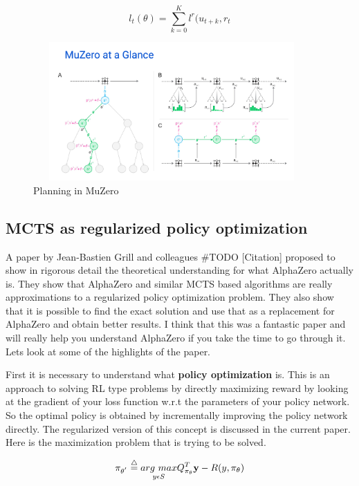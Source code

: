\begin{equation}
    l_{t}(\theta) = \sum_{k=0}^{K} l^{r}(u_{t + k},r_{t}
\end{equation}


\begin{figure}[H]
       \centering
       \includegraphics[width=400px,height=200px]{images/muzero_planning.png}
       \caption{Planning in MuZero}
       \label{fig:my_label}
\end{figure}


\subsection{MCTS as regularized policy optimization}

A paper by Jean-Bastien Grill and colleagues #TODO [Citation] proposed to show in rigorous detail the theoretical understanding for what AlphaZero actually is. They show that AlphaZero and similar MCTS based algorithms are really approximations to a regularized policy optimization problem. They also show that it is possible to find the exact solution and use that as a replacement for AlphaZero and obtain better results. I think that this was a fantastic paper and will really help you understand AlphaZero if you take the time to go through it. Lets look at some of the highlights of the paper. 

First it is necessary to understand what \textbf{policy optimization} is. This is an approach to solving RL type problems by directly maximizing reward by looking at the gradient of your loss function w.r.t the parameters of your policy network. So the optimal policy is obtained by incrementally improving the policy network directly. The regularized version of this concept is discussed in the current paper. Here is the maximization problem that is trying to be solved.

\begin{equation}
    \pi_{\theta^{'}} \overset{\triangle}{=} \underset{y \epsilon S}{arg \ max} Q_{\pi_{\theta}}^{T}\textbf{y} - R(y,\pi_{\theta})
\end{equation}


